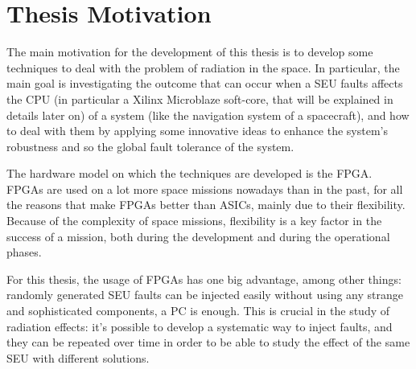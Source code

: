 \section{Thesis Motivation}
The main motivation for the development of this thesis is to develop some techniques to deal with the problem of radiation in the space. In particular, the main goal is investigating the outcome that can occur when a SEU faults affects the CPU (in particular a Xilinx Microblaze soft-core, that will be explained in details later on) of a system (like the navigation system of a spacecraft), and how to deal with them by applying some innovative ideas to enhance the system's robustness and so the global fault tolerance of the system. \bigskip

The hardware model on which the techniques are developed is the FPGA. FPGAs are used on a lot more space missions nowadays than in the past, for all the reasons that make FPGAs better than ASICs, mainly due to their flexibility. Because of the complexity of space missions, flexibility is a key factor in the success of a mission, both during the development and during the operational phases. \bigskip

For this thesis, the usage of FPGAs has one big advantage, among other things: randomly generated SEU faults can be injected easily without using any strange and sophisticated components, a PC is enough. This is crucial in the study of radiation effects: it's possible to develop a systematic way to inject faults, and they can be repeated over time in order to be able to study the effect of the same SEU with different solutions.